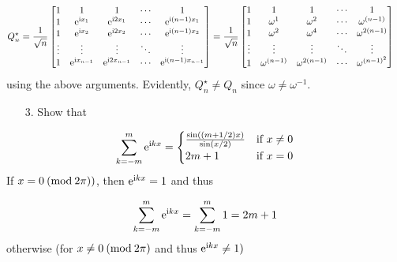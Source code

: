 \documentclass[12pt,a4paper]{article}
\begin{document}
\begin{align*}
Q_n^\ensuremath{\star} &= {1 \over \sqrt{n}} \begin{bmatrix}
1 & 1 & 1&  \ensuremath{\cdots} & 1 \\
1 & {\rm e}^{{\rm i} x_1} & {\rm e}^{{\rm i} 2 x_1} & \ensuremath{\cdots} & {\rm e}^{{\rm i} (n-1) x_1} \\
1 &  {\rm e}^{{\rm i} x_2}  & {\rm e}^{{\rm i} 2 x_2} & \ensuremath{\cdots} & {\rm e}^{{\rm i} (n-1)x_2} \\
\ensuremath{\vdots} & \ensuremath{\vdots} & \ensuremath{\vdots} & \ensuremath{\ddots} & \ensuremath{\vdots} \\
1 & {\rm e}^{{\rm i} x_{n-1}} & {\rm e}^{{\rm i} 2 x_{n-1}} & \ensuremath{\cdots} & {\rm e}^{{\rm i} (n-1) x_{n-1}}
\end{bmatrix}
= {1 \over \sqrt{n}} \begin{bmatrix}
1 & 1 & 1&  \ensuremath{\cdots} & 1 \\
1 & \ensuremath{\omega}^{1} & \ensuremath{\omega}^{2} & \ensuremath{\cdots} & \ensuremath{\omega}^{(n-1)}\\
1 & \ensuremath{\omega}^{2} & \ensuremath{\omega}^{4} & \ensuremath{\cdots} & \ensuremath{\omega}^{2(n-1)}\\
\ensuremath{\vdots} & \ensuremath{\vdots} & \ensuremath{\vdots} & \ensuremath{\ddots} & \ensuremath{\vdots} \\
1 & \ensuremath{\omega}^{(n-1)} & \ensuremath{\omega}^{2(n-1)} & \ensuremath{\cdots} & \ensuremath{\omega}^{(n-1)^2}
\end{bmatrix}
\end{align*}
using the above arguments. Evidently, $Q_n^\ensuremath{\star} \neq Q_n$ since $\ensuremath{\omega} \neq \ensuremath{\omega}^{-1}$.

\begin{itemize}
\item[3. ] Show that 

\end{itemize}
\[
 \sum_{k=-m}^{m} {\rm e}^{{\rm i}kx} = \begin{cases}
 \frac{\sin((m+1/2)x)}{\sin(x/2)} & \text{if } x \neq 0 \\
 2m + 1 & \text{if } x = 0
 \end{cases}
\]
If $x = 0 \: ({\rm mod}\: 2\pi))$, then ${\rm e}^{{\rm i}kx}=1$ and thus

\[
\sum_{k=-m}^{m} {\rm e}^{{\rm i}kx} = \sum_{k=-m}^{m} 1 = 2m + 1
\]
otherwise (for $x \neq 0 \:({\rm mod}\: 2\pi)$ and thus ${\rm e}^{{\rm i}kx} \neq 1)$
\end{document}
